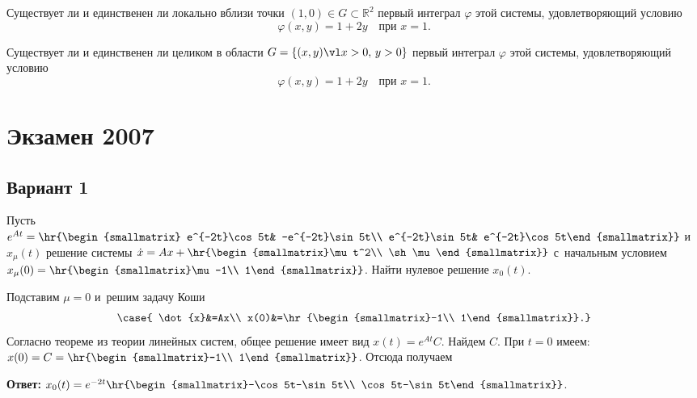 \documentclass{article}
\begin{document}
\begin{problem}[1 балл]
Существует ли и единственен ли локально вблизи точки $(1,0)\in G\subset\mathbb{R}^2$
первый интеграл $\varphi$ этой системы, удовлетворяющий условию
$$\varphi(x,y)=1+2y\quad\text{при $x=1$}.$$
\end{problem}

\begin{problem}[3 балла]
Существует ли и единственен ли целиком в области $G=\{(x,y)\vl  x>0,\,y>0\}$
первый интеграл $\varphi$ этой системы, удовлетворяющий условию
$$\varphi(x,y)=1+2y\quad\text{при $x=1$}.$$
\end{problem}

\section{Экзамен 2007}

\setcounter{problem}{0}
\subsection{Вариант 1}

\begin{problem}[1 балл]
Пусть $e^{At}=\hr{\begin{smallmatrix} e^{-2t}\cos 5t&
-e^{-2t}\sin 5t\\ e^{-2t}\sin 5t& e^{-2t}\cos
5t\end{smallmatrix}}$ и~$x_\mu(t)$ решение системы
$\dot{x}=Ax+\hr{\begin{smallmatrix}\mu t^2\\ \sh \mu\end{smallmatrix}}$ с~начальным условием
$x_\mu(0)=\hr{\begin{smallmatrix}\mu-1\\ 1\end{smallmatrix}}$.
Найти нулевое решение $x_0(t)$.
\end{problem}
\begin{solution}
Подставим $\mu=0$ и~решим задачу Коши
$$
\case{
\dot{x}&=Ax\\
x(0)&=\hr{\begin{smallmatrix}-1\\ 1\end{smallmatrix}}.}
$$
Согласно теореме из теории линейных систем, общее решение имеет вид
$x(t)=e^{At}C$. Найдем $C$. При $t=0$ имеем: $x(0)=C=\hr{\begin{smallmatrix}-1\\ 1\end{smallmatrix}}$.
Отсюда получаем

\textbf{Ответ:} $x_0(t)=e^{-2t}\hr{\begin{smallmatrix}-\cos 5t-\sin 5t\\ \cos 5t-\sin 5t\end{smallmatrix}}$.
\end{solution}
\end{document}
